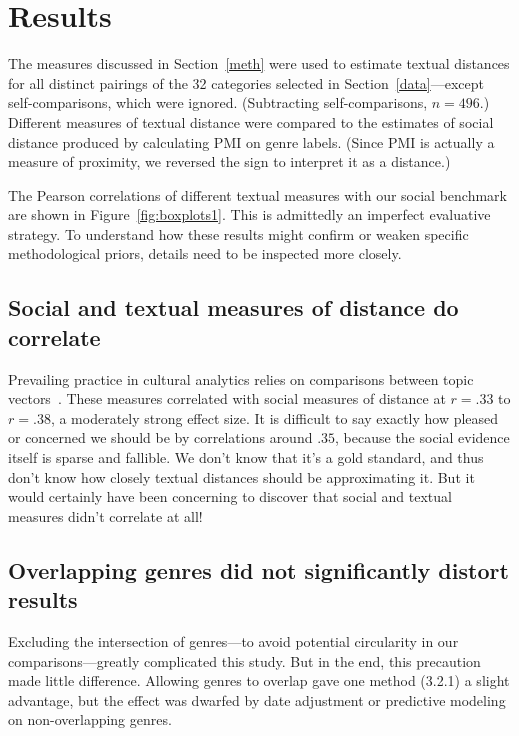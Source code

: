 \documentclass[11pt]{article}
\begin{document}
\section{Results}

The measures discussed in Section~\ref{meth} were used to estimate textual distances for all distinct pairings of the 32 categories selected in Section~\ref{data}---except self-comparisons, which were ignored. (Subtracting self-comparisons, $n = 496$.) Different measures of textual distance were compared to the estimates of social distance produced by calculating PMI on genre labels. (Since PMI is actually a measure of proximity, we reversed the sign to interpret it as a distance.) 

The Pearson correlations of different textual measures with our social benchmark are shown in Figure~\ref{fig:boxplots1}. This is admittedly an imperfect evaluative strategy. To understand how these results might confirm or weaken specific methodological priors, details need to be inspected more closely.

\subsection{Social and textual measures of distance do correlate}

Prevailing practice in cultural analytics relies on comparisons between topic vectors~\cite{jockers:macroanalysis,barron:individuals,mauch:evolution}. These measures correlated with social measures of distance at $r = .33$ to $r = .38$, a moderately strong effect size. It is difficult to say exactly how pleased or concerned we should be by correlations around $.35$, because the social evidence itself is sparse and fallible. We don't know that it's a gold standard, and thus don't know how closely textual distances should be approximating it. But it would certainly have been concerning to discover that social and textual measures didn't correlate at all!

\subsection{Overlapping genres did not significantly distort results}

Excluding the intersection of genres---to avoid potential circularity in our comparisons---greatly complicated this study. But in the end, this precaution made little difference. Allowing genres to overlap gave one method (3.2.1) a slight advantage, but the effect was dwarfed by date adjustment or predictive modeling on non-overlapping genres.
\end{document}
